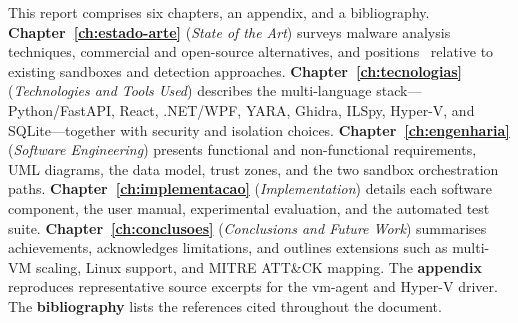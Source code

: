 This report comprises six chapters, an appendix, and a bibliography. \textbf{Chapter~\ref{ch:estado-arte}}
(\emph{State of the Art}) surveys malware analysis techniques, commercial and open-source
alternatives, and positions \rat\ relative to existing sandboxes and detection approaches.
\textbf{Chapter~\ref{ch:tecnologias}} (\emph{Technologies and Tools Used}) describes the
multi-language stack---Python/FastAPI, React, .NET/WPF, YARA, Ghidra, ILSpy, Hyper-V, and
SQLite---together with security and isolation choices. \textbf{Chapter~\ref{ch:engenharia}}
(\emph{Software Engineering}) presents functional and non-functional requirements, UML diagrams,
the data model, trust zones, and the two sandbox orchestration paths. \textbf{Chapter~\ref{ch:implementacao}}
(\emph{Implementation}) details each software component, the user manual, experimental
evaluation, and the automated test suite. \textbf{Chapter~\ref{ch:conclusoes}} (\emph{Conclusions
and Future Work}) summarises achievements, acknowledges limitations, and outlines extensions such
as multi-VM scaling, Linux support, and MITRE ATT\&CK mapping. The \textbf{appendix} reproduces
representative source excerpts for the vm-agent and Hyper-V driver. The \textbf{bibliography}
lists the references cited throughout the document.
